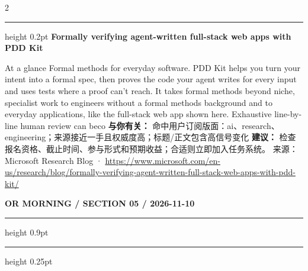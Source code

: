 \documentclass[10.5pt]{ctexart}
\begin{document}
\begin{multicols}{2}
\vspace{2mm}
\hrule height 0.2pt
\vspace{2mm}
{\large\bfseries Formally verifying agent-written full-stack web apps with PDD Kit}\par
At a glance Formal methods for everyday software. PDD Kit helps you turn your intent into a formal spec, then proves the code your agent writes for every input and uses tests where a proof can’t reach. It takes formal methods beyond niche, specialist work to engineers without a formal methods background and to everyday applications, like the full-stack web app shown here. Exhaustive line-by-line human review can beco
\textbf{与你有关：} 命中用户订阅版面：ai、research、engineering；来源接近一手且权威度高；标题/正文包含高信号变化
\textbf{建议：} 检查报名资格、截止时间、参与形式和预期收益；合适则立即加入任务系统。
{\footnotesize\color{ormuted} 来源：Microsoft Research Blog · \url{https://www.microsoft.com/en-us/research/blog/formally-verifying-agent-written-full-stack-web-apps-with-pdd-kit/}}
\end{multicols}
\newpage
{\small\bfseries OR MORNING / SECTION 05 / 2026-11-10}
\vspace{2mm}
\hrule height 0.9pt
\vspace{1.5mm}
\hrule height 0.25pt
\vspace{4mm}
\end{document}
